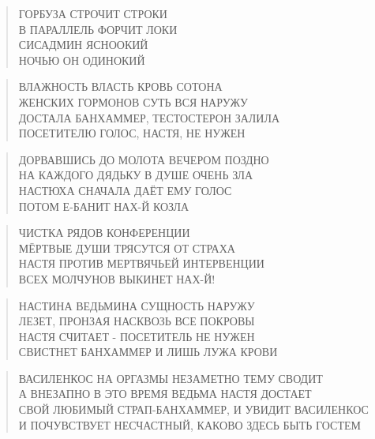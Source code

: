 \poemtitle{***}
\begin{verse}
ГОРБУЗА СТРОЧИТ СТРОКИ\\
В ПАРАЛЛЕЛЬ ФОРЧИТ ЛОКИ\\
СИСАДМИН ЯСНООКИЙ\\
НОЧЬЮ ОН ОДИНОКИЙ
\end{verse}

\poemtitle{***}
\begin{verse}
ВЛАЖНОСТЬ ВЛАСТЬ КРОВЬ СОТОНА\\
ЖЕНСКИХ ГОРМОНОВ СУТЬ ВСЯ НАРУЖУ\\
ДОСТАЛА БАНХАММЕР, ТЕСТОСТЕРОН ЗАЛИЛА\\
ПОСЕТИТЕЛЮ ГОЛОС, НАСТЯ, НЕ НУЖЕН
\end{verse}

\poemtitle{***}
\begin{verse}
ДОРВАВШИСЬ ДО МОЛОТА ВЕЧЕРОМ ПОЗДНО\\
НА КАЖДОГО ДЯДЬКУ В ДУШЕ ОЧЕНЬ ЗЛА\\
НАСТЮХА СНАЧАЛА ДАЁТ ЕМУ ГОЛОС\\
ПОТОМ Е-БАНИТ НАХ-Й КОЗЛА
\end{verse}

\poemtitle{***}
\begin{verse}
ЧИСТКА РЯДОВ КОНФЕРЕНЦИИ \\
МЁРТВЫЕ ДУШИ ТРЯСУТСЯ ОТ СТРАХА\\
НАСТЯ ПРОТИВ МЕРТВЯЧЬЕЙ ИНТЕРВЕНЦИИ\\
ВСЕХ МОЛЧУНОВ ВЫКИНЕТ НАХ-Й!
\end{verse}

\poemtitle{***}
\begin{verse}
НАСТИНА ВЕДЬМИНА СУЩНОСТЬ НАРУЖУ\\
ЛЕЗЕТ, ПРОНЗАЯ НАСКВОЗЬ ВСЕ ПОКРОВЫ\\
НАСТЯ СЧИТАЕТ - ПОСЕТИТЕЛЬ НЕ НУЖЕН\\
СВИСТНЕТ БАНХАММЕР И ЛИШЬ ЛУЖА КРОВИ
\end{verse}

\poemtitle{***}
\begin{verse}
ВАСИЛЕНКОС НА ОРГАЗМЫ НЕЗАМЕТНО ТЕМУ СВОДИТ\\
А ВНЕЗАПНО В ЭТО ВРЕМЯ ВЕДЬМА НАСТЯ ДОСТАЕТ\\
СВОЙ ЛЮБИМЫЙ СТРАП-БАНХАММЕР, И УВИДИТ ВАСИЛЕНКОС\\
И ПОЧУВСТВУЕТ НЕСЧАСТНЫЙ, КАКОВО ЗДЕСЬ БЫТЬ ГОСТЕМ
\end{verse}

